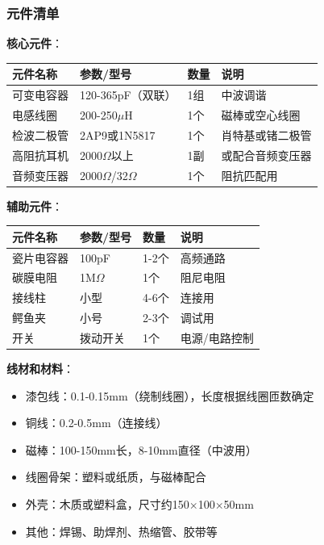 \subsubsection{元件清单}
\label{sec:crystal_radio_parts}

\textbf{核心元件}：

\begin{center}
\begin{tabular}{|p{4cm}|p{3cm}|p{4cm}|p{3cm}|}
\hline
\textbf{元件名称} & \textbf{参数/型号} & \textbf{数量} & \textbf{说明} \\
\hline
可变电容器 & 120-365pF（双联） & 1组 & 中波调谐 \\
电感线圈 & 200-250$\mu$H & 1个 & 磁棒或空心线圈 \\
检波二极管 & 2AP9或1N5817 & 1个 & 肖特基或锗二极管 \\
高阻抗耳机 & 2000$\Omega$以上 & 1副 & 或配合音频变压器 \\
音频变压器 & 2000$\Omega$/32$\Omega$ & 1个 & 阻抗匹配用 \\
\hline
\end{tabular}
\end{center}

\textbf{辅助元件}：

\begin{center}
\begin{tabular}{|p{4cm}|p{3cm}|p{4cm}|p{3cm}|}
\hline
\textbf{元件名称} & \textbf{参数/型号} & \textbf{数量} & \textbf{说明} \\
\hline
瓷片电容器 & 100pF & 1-2个 & 高频通路 \\
碳膜电阻 & 1M$\Omega$ & 1个 & 阻尼电阻 \\
接线柱 & 小型 & 4-6个 & 连接用 \\
鳄鱼夹 & 小号 & 2-3个 & 调试用 \\
开关 & 拨动开关 & 1个 & 电源/电路控制 \\
\hline
\end{tabular}
\end{center}

\textbf{线材和材料}：
\begin{itemize}
    \item 漆包线：0.1-0.15mm（绕制线圈），长度根据线圈匝数确定
    \item 铜线：0.2-0.5mm（连接线）
    \item 磁棒：100-150mm长，8-10mm直径（中波用）
    \item 线圈骨架：塑料或纸质，与磁棒配合
    \item 外壳：木质或塑料盒，尺寸约150$\times$100$\times$50mm
    \item 其他：焊锡、助焊剂、热缩管、胶带等
\end{itemize}

